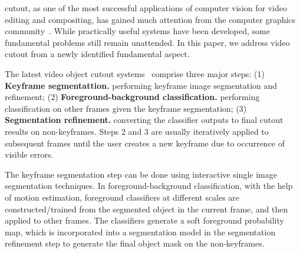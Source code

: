 \documentclass[10pt,journal,compsoc]{newIEEEtran}
\begin{document}
 cutout, as one of the most successful applications of computer vision for video editing and compositing, has gained much attention from the computer graphics community~\cite{chuang2002video,agarwala2004keyframe,Li05VideoGCut_SIGGRAPH,Wang05IVC_SIGGRAPH,Bai09VideoSnapCut_SIGGRAPH,Zhong2012UDC_SIGGRAPHAsia}. While practically useful systems have been developed, some fundamental problems still remain unattended. In this paper, we address video cutout from a newly identified fundamental aspect.

The latest video object cutout systems~\cite{Bai09VideoSnapCut_SIGGRAPH,bai2010dynamic,zhong2010transductive,Zhong2012UDC_SIGGRAPHAsia,Fan2015JumpCut} comprise three major steps: (1)  \textbf{Keyframe segmentattion.} performing keyframe image segmentation and refinement; (2) \textbf{Foreground-background classification.} performing classification on other frames given the keyframe segmentation; (3)  \textbf{Segmentation refinement.} converting the classifier outputs to final cutout results on non-keyframes. Steps 2 and 3 are usually iteratively applied to subsequent frames until the user creates a new keyframe due to occurrence of visible errors.

The keyframe segmentation step can be done using interactive single image segmentation techniques. In foreground-background classification, with the help of motion estimation, foreground classifiers at different scales are constructed/trained from the segmented object in the current frame, and then applied to other frames. The classifiers generate a soft foreground probability map, which is incorporated into a segmentation model in the segmentation refinement step to generate the final object mask on the non-keyframes.
\end{document}
